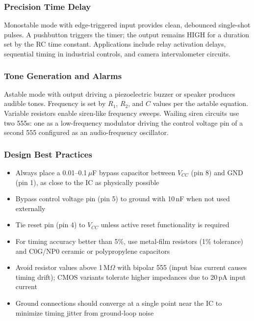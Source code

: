 \documentclass[11pt,letterpaper]{article}
\begin{document}
\subsubsection{Precision Time Delay}

Monostable mode with edge-triggered input provides clean, debounced single-shot pulses. A pushbutton triggers the timer; the output remains HIGH for a duration set by the RC time constant. Applications include relay activation delays, sequential timing in industrial controls, and camera intervalometer circuits.

\subsubsection{Tone Generation and Alarms}

Astable mode with output driving a piezoelectric buzzer or speaker produces audible tones. Frequency is set by $R_1$, $R_2$, and $C$ values per the astable equation. Variable resistors enable siren-like frequency sweeps. Wailing siren circuits use two 555s: one as a low-frequency modulator driving the control voltage pin of a second 555 configured as an audio-frequency oscillator.

\subsubsection{Design Best Practices}

\begin{itemize}[leftmargin=2em]
  \item Always place a 0.01--0.1\,$\mu$F bypass capacitor between $V_{CC}$ (pin 8) and GND (pin 1), as close to the IC as physically possible
  \item Bypass control voltage pin (pin 5) to ground with 10\,nF when not used externally
  \item Tie reset pin (pin 4) to $V_{CC}$ unless active reset functionality is required
  \item For timing accuracy better than 5\%, use metal-film resistors (1\% tolerance) and C0G/NP0 ceramic or polypropylene capacitors
  \item Avoid resistor values above 1\,M$\Omega$ with bipolar 555 (input bias current causes timing drift); CMOS variants tolerate higher impedances due to 20\,pA input current
  \item Ground connections should converge at a single point near the IC to minimize timing jitter from ground-loop noise
\end{itemize}
\end{document}
